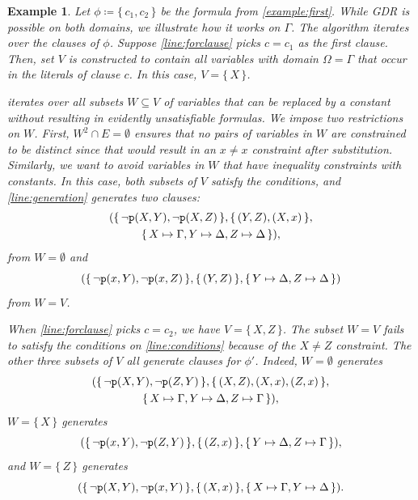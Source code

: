 \documentclass{article}
\newtheorem{example}{Example}
\newcommand{\predicate}{\texttt{\textup{p}}}
\begin{document}
\begin{example}
  Let $\phi \coloneqq \{\, c_1, c_2 \,\}$ be the formula from
  \cref{example:first}. While GDR is possible on both domains, we illustrate how
  it works on $\Gamma$. The algorithm iterates over the clauses of $\phi$.
  Suppose \cref{line:forclause} picks $c = c_1$ as the first clause. Then, set
  $V$ is constructed to contain all variables with domain $\Omega = \Gamma$ that
  occur in the literals of clause $c$. In this case, $V = \{\, X \,\}$.

   iterates over all subsets $W \subseteq V$ of variables
  that can be replaced by a constant without resulting in evidently
  unsatisfiable formulas. We impose two restrictions on $W$. First,
  $W^2 \cap E = \emptyset$ ensures that no pairs of variables in $W$ are
  constrained to be distinct since that would result in an $x \ne x$ constraint
  after substitution. Similarly, we want to avoid variables in $W$ that have
  inequality constraints with constants. In this case, both subsets of $V$
  satisfy the conditions, and \cref{line:generation} generates two clauses:
  \begin{multline*}
    (\{\, \neg \predicate(X, Y), \neg \predicate(X, Z) \,\}, \{\, (Y, Z), (X, x) \,\}, \\
    \{\, X \mapsto \Gamma, Y \mapsto \Delta, Z \mapsto \Delta \,\}),
  \end{multline*}
  from $W = \emptyset$ and
  \[
    (\{\, \neg \predicate(x, Y), \neg \predicate(x, Z) \,\}, \{\, (Y, Z) \,\}, \{\, Y \mapsto \Delta, Z \mapsto \Delta \,\})
  \]
  from $W = V$.

  When \cref{line:forclause} picks $c = c_2$, we have $V = \{\, X, Z \,\}$. The
  subset $W = V$ fails to satisfy the conditions on \cref{line:conditions}
  because of the $X \ne Z$ constraint. The other three subsets of $V$ all
  generate clauses for $\phi'$. Indeed, $W = \emptyset$ generates
  \begin{multline*}
    (\{\, \neg \predicate(X, Y), \neg \predicate(Z, Y) \,\}, \{\, (X, Z), (X, x), (Z, x) \,\}, \\
    \{\, X \mapsto \Gamma, Y \mapsto \Delta, Z \mapsto \Gamma \,\}),
  \end{multline*}
  $W = \{\, X \,\}$ generates
  \[
    (\{\, \neg \predicate(x, Y), \neg \predicate(Z, Y) \,\}, \{\, (Z, x) \,\}, \{\, Y \mapsto \Delta, Z \mapsto \Gamma \,\}),
  \]
  and $W = \{\, Z \,\}$ generates
  \[
    (\{\, \neg \predicate(X, Y), \neg \predicate(x, Y) \,\}, \{\, (X, x) \,\}, \{\, X \mapsto \Gamma, Y \mapsto \Delta \,\}).
  \]
\end{example}
\end{document}
